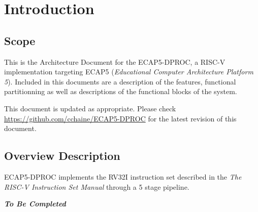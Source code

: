 \section{Introduction}
\subsection{Scope}
\begin{content}
This is the Architecture Document for the ECAP5-DPROC, a RISC-V implementation targeting ECAP5 (\textit{Educational Computer Architecture Platform 5}). Included in this documents are a description of the features, functional partitionning as well as descriptions of the functional blocks of the system.

This document is updated as appropriate. Please check \url{https://github.com/cchaine/ECAP5-DPROC} for the latest revision of this document.
\end{content}

\subsection{Overview Description}
\begin{content}
ECAP5-DPROC implements the RV32I instruction set described in the \textit{The RISC-V Instruction Set Manual} through a 5 stage pipeline.

\textit{\textbf{To Be Completed}}
\end{content}

\newpage
